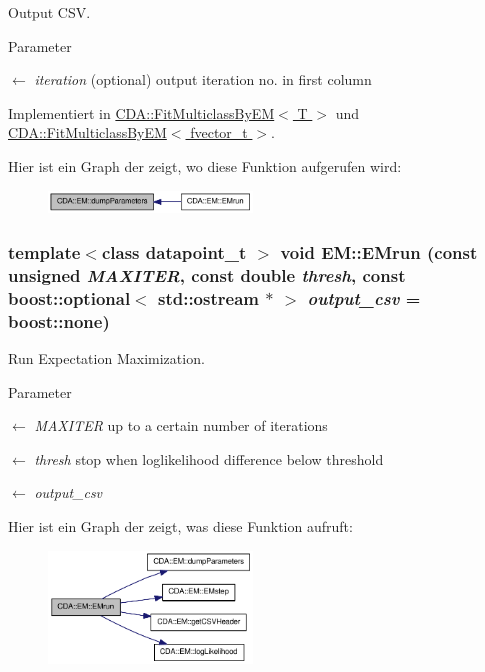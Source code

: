 Output CSV. 


\begin{DoxyParams}{Parameter}
\item[\mbox{$\leftarrow$} {\em iteration}](optional) output iteration no. in first column \end{DoxyParams}


Implementiert in \hyperlink{classCDA_1_1FitMulticlassByEM_abd04a7135250a427a100c95bf2bf43a9}{CDA::FitMulticlassByEM$<$ T $>$} und \hyperlink{classCDA_1_1FitMulticlassByEM_abd04a7135250a427a100c95bf2bf43a9}{CDA::FitMulticlassByEM$<$ fvector\_\-t $>$}.



Hier ist ein Graph der zeigt, wo diese Funktion aufgerufen wird:\nopagebreak
\begin{figure}[H]
\begin{center}
\leavevmode
\includegraphics[width=154pt]{classCDA_1_1EM_ad2655bd878821e73ba18beff576a2b4a_icgraph}
\end{center}
\end{figure}


\hypertarget{classCDA_1_1EM_a1c8fa9008da1f168f211f48c578dce5f}{
\subsubsection[{EMrun}]{\setlength{\rightskip}{0pt plus 5cm}template$<$class datapoint\_\-t $>$ void EM::EMrun (const unsigned {\em MAXITER}, \/  const double {\em thresh}, \/  const boost::optional$<$ std::ostream $\ast$ $>$ {\em output\_\-csv} = {\ttfamily boost::none})}}
\label{classCDA_1_1EM_a1c8fa9008da1f168f211f48c578dce5f}


Run Expectation Maximization. 


\begin{DoxyParams}{Parameter}
\item[\mbox{$\leftarrow$} {\em MAXITER}]up to a certain number of iterations \item[\mbox{$\leftarrow$} {\em thresh}]stop when loglikelihood difference below threshold \item[\mbox{$\leftarrow$} {\em output\_\-csv}]\end{DoxyParams}


Hier ist ein Graph der zeigt, was diese Funktion aufruft:\nopagebreak
\begin{figure}[H]
\begin{center}
\leavevmode
\includegraphics[width=154pt]{classCDA_1_1EM_a1c8fa9008da1f168f211f48c578dce5f_cgraph}
\end{center}
\end{figure}



